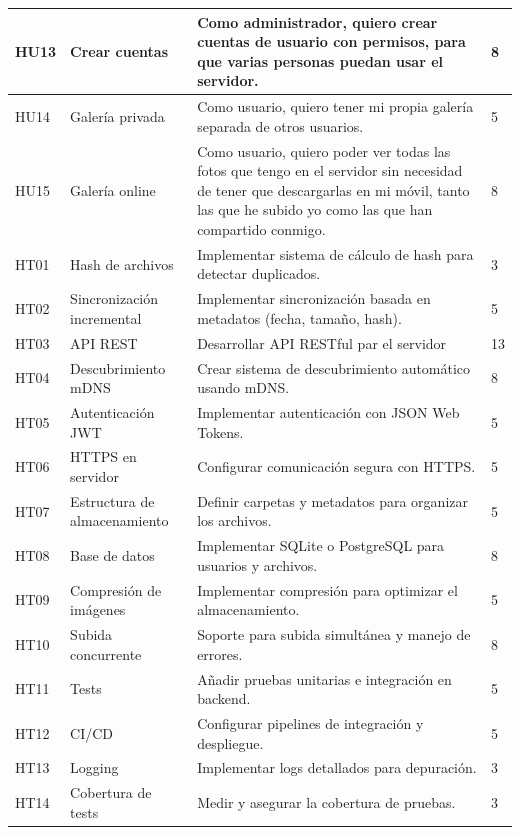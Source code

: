 \begin{tabularx}{\textwidth}{|l|l|>{\raggedright\arraybackslash}X|l|}
    \hline
    HU13 & Crear cuentas & Como administrador, quiero crear cuentas de usuario con permisos, para que varias personas puedan usar el servidor. & 8 \\
    \hline
    HU14 & Galería privada & Como usuario, quiero tener mi propia galería separada de otros usuarios. & 5 \\
    \hline
    HU15 & Galería online & Como usuario, quiero poder ver todas las fotos que tengo en el servidor sin necesidad de tener que descargarlas en mi móvil, tanto las que he subido yo como las que han compartido conmigo. & 8 \\
    \hline
    HT01 & Hash de archivos & Implementar sistema de cálculo de hash para detectar duplicados. & 3 \\
    \hline
    HT02 & Sincronización incremental & Implementar sincronización basada en metadatos (fecha, tamaño, hash). & 5 \\
    \hline
    HT03 & API REST & Desarrollar API RESTful par el servidor & 13 \\
    \hline
    HT04 & Descubrimiento mDNS & Crear sistema de descubrimiento automático usando mDNS. & 8 \\
    \hline
    HT05 & Autenticación JWT & Implementar autenticación con JSON Web Tokens. & 5 \\
    \hline
    HT06 & HTTPS en servidor & Configurar comunicación segura con HTTPS. & 5 \\
    \hline
    HT07 & Estructura de almacenamiento & Definir carpetas y metadatos para organizar los archivos. & 5 \\
    \hline
    HT08 & Base de datos & Implementar SQLite o PostgreSQL para usuarios y archivos. & 8 \\
    \hline
    HT09 & Compresión de imágenes & Implementar compresión para optimizar el almacenamiento. & 5 \\
    \hline
    HT10 & Subida concurrente & Soporte para subida simultánea y manejo de errores. & 8 \\
    \hline
    HT11 & Tests & Añadir pruebas unitarias e integración en backend. & 5 \\
    \hline
    HT12 & CI/CD & Configurar pipelines de integración y despliegue. & 5 \\
    \hline
    HT13 & Logging & Implementar logs detallados para depuración. & 3 \\
    \hline
    HT14 & Cobertura de tests & Medir y asegurar la cobertura de pruebas. & 3 \\
    \hline

\end{tabularx}
